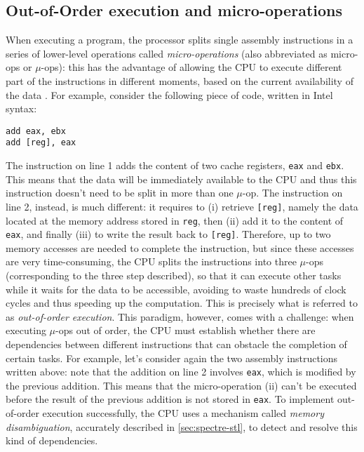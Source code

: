 \documentclass[12pt,a4paper]{book}
\theoremstyle{definition}
\begin{document}
	\subsection{Out-of-Order execution and micro-operations}\label{ooo-exec}
	When executing a program, the processor splits single assembly instructions in a series of lower-level operations called \textit{micro-operations} (also abbreviated as micro-ops or $\mu$-ops): this has the advantage of allowing the CPU to execute different part of the instructions in different moments, based on the current availability of the data \cite{Fog2021}. For example, consider the following piece of code, written in Intel syntax:
	\begin{lstlisting}
add eax, ebx
add [reg], eax
	\end{lstlisting}
	The instruction on line 1 adds the content of two cache registers, \texttt{eax} and \texttt{ebx}. This means that the data will be immediately available to the CPU and thus this instruction doesn't need to be split in more than one $\mu$-op. The instruction on line 2, instead, is much different: it requires to (i) retrieve \texttt{[reg]}, namely the data located at the memory address stored in \texttt{reg}, then (ii) add it to the content of \texttt{eax}, and finally (iii) to write the result back to \texttt{[reg]}. Therefore, up to two memory accesses are needed to complete the instruction, but since these accesses are very time-consuming, the CPU splits the instructions into three $\mu$-ops (corresponding to the three step described), so that it can execute other tasks while it waits for the data to be accessible, avoiding to waste hundreds of clock cycles and thus speeding up the computation. This is precisely what is referred to as \textit{out-of-order execution}. This paradigm, however, comes with a challenge: when executing $\mu$-ops out of order, the CPU must establish whether there are dependencies between different instructions that can obstacle the completion of certain tasks.	For example, let's consider again the two assembly instructions written above: note that the addition on line 2 involves \texttt{eax}, which is modified by the previous addition. This means that the micro-operation (ii) can't be executed before the result of the previous addition is not stored in \texttt{eax}. To implement out-of-order execution successfully, the CPU uses a mechanism called \textit{memory disambiguation}, accurately described in \ref{sec:spectre-stl}, to detect and resolve this kind of dependencies. 
	
\end{document}
